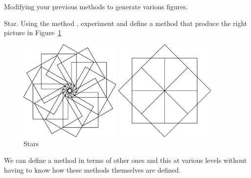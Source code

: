 
\begin{exonofig}
Modifying your previous methods to generate various figures.
\end{exonofig}


\begin{exonofig}{Star.} 
Using the method , experiment and define a method  that produce the right picture in Figure~\ref{c7star}
\end{exonofig}

\begin{figure}[!htbp]
\begin{minipage}[c]{.4\linewidth}
\centerline{\includegraphics[width=5cm]{comp4SquaresThree}}
\end{minipage}
\hfill
\begin{minipage}[c]{.4\linewidth}
\centerline{\includegraphics[width=5cm]{comp4SquaresFour}}
\end{minipage}
\label{c7star}
\caption{Stars}
\end{figure}


\summa

We can define a method in terms of other ones and this at various levels without having to know how these methods themselves are defined.


\ifx\wholebook\relax\else
\fi
